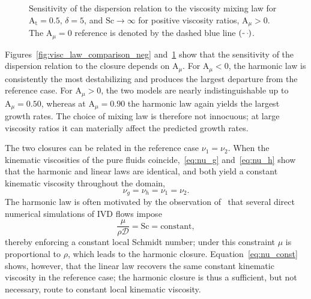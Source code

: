 \documentclass[11pt]{article}
\DeclareRobustCommand{\dashlegend}{%
    \tikz[baseline=-0.6ex]\draw[line width=0.5pt,dashed] (0,0) -- (0.25,0);%
}
\newcommand{\Atw}{\mathrm{A_t}}
\newcommand{\Sch}{\mathrm{Sc}}
\newcommand{\Amu}{\mathrm{A}_{\mu}}
\newenvironment{appen}{\appendix}{}
\newif\ifloadfig
\newcommand{\figfile}[1]{\ifloadfig\fi}
\begin{document}
\begin{appen}
\begin{figure}
\begin{minipage}[t]{0.32\textwidth}
    \end{minipage}
    \begin{minipage}[t]{0.32\textwidth}
        \centering
        \figfile{figures/verification_figures/V06_visc_law_Amu+0.90.tex}
    \end{minipage}
    \caption{Sensitivity of the dispersion relation to the viscosity mixing law for \(\Atw = 0.5\), \(\delta = 5\), and \(\Sch \to \infty\) for positive viscosity ratios, \(\Amu > 0\). The \(\Amu = 0\) reference is denoted by the dashed blue line \((\dashlegend)\).}
    \label{fig:visc_law_comparison_pos}
\end{figure}
Figures~\ref{fig:visc_law_comparison_neg} and~\ref{fig:visc_law_comparison_pos} show that the sensitivity of the dispersion relation to the closure depends on \(\Amu\). For \(\Amu < 0\), the harmonic law is consistently the most destabilizing and produces the largest departure from the reference case. For \(\Amu > 0\), the two models are nearly indistinguishable up to \(\Amu = 0.50\), whereas at \(\Amu = 0.90\) the harmonic law again yields the largest growth rates. The choice of mixing law is therefore not innocuous; at large viscosity ratios it can materially affect the predicted growth rates.

The two closures can be related in the reference case \(\nu_1 = \nu_2\). When the kinematic viscosities of the pure fluids coincide,~\eqref{eq:nu_g} and~\eqref{eq:nu_h} show that the harmonic and linear laws are identical, and both yield a constant kinematic viscosity throughout the domain,
\begin{equation}
    \label{eq:nu_const}
    \nu_g = \nu_h = \nu_1 = \nu_2.
\end{equation}
The harmonic law is often motivated by the observation of~\citet{livescu-2020} that several direct numerical simulations of IVD flows impose
\begin{equation}
    \frac{\mu}{\rho \mathcal{D}} = \Sch = \mathrm{constant},
\end{equation}
thereby enforcing a constant local Schmidt number; under this constraint \(\mu\) is proportional to \(\rho\), which leads to the harmonic closure. Equation~\eqref{eq:nu_const} shows, however, that the linear law recovers the same constant kinematic viscosity in the reference case; the harmonic closure is thus a sufficient, but not necessary, route to constant local kinematic viscosity.


\end{appen}
\end{document}
